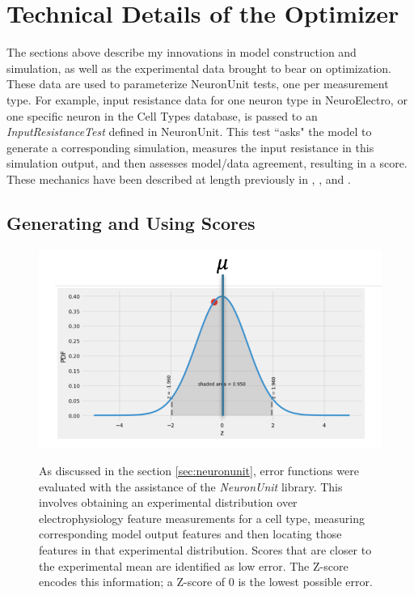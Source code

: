 \section{Technical Details of the Optimizer}
\label{sec:tech-details}
The sections above describe my innovations in model construction and simulation, as well as the experimental data brought to bear on optimization. These data are used to parameterize NeuronUnit tests, one per measurement type.
For example, input resistance data for one neuron type in NeuroElectro, or one specific neuron in the Cell Types database, is passed to an \textit{InputResistanceTest} defined in NeuronUnit.
This test ``asks" the model to generate a corresponding simulation, measures the input resistance in this simulation output, and then assesses model/data agreement, resulting in a score.
These mechanics have been described at length previously in \cite{omar2014collaborative}, \cite{gerkin_neuronunit}, and \cite{birgiolas2019towards}.

\subsection{Generating and Using Scores}
\begin{figure}
\begin{center}
    \label{fig:normal-dist}
	\includegraphics{figures/normal_distribution}
    \caption[Z-scores for NeuronUnit Tests]{As discussed in the section \ref{sec:neuronunit}, error functions were evaluated with the assistance of the \emph{NeuronUnit} library.
    This involves obtaining an experimental distribution over electrophysiology feature measurements for a cell type, measuring corresponding model output features and then locating those features in that experimental distribution. 
    Scores that are closer to the experimental mean are identified as low error.
	The Z-score encodes this information; a Z-score of 0 is the lowest possible error.}
\end{center}
	
\end{figure}

